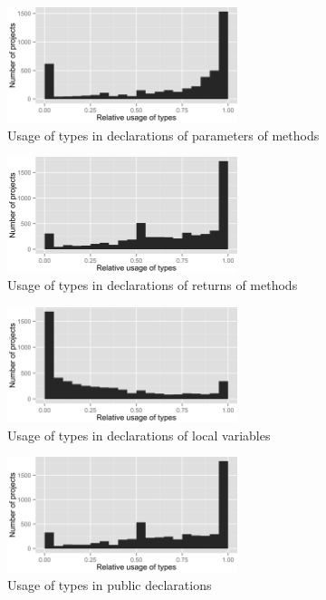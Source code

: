 \begin{figure}[h]
\centering 
\includegraphics[width=0.6\textwidth]{../aosd_2014/analysis/result/script/class/histograms/8_Method_Parameter.png} 
\caption{Usage of types in declarations of parameters of methods}
\end{figure}

\begin{figure}[h]
\centering 
\includegraphics[width=0.6\textwidth]{../aosd_2014/analysis/result/script/class/histograms/7_Method_Return.png} 
\caption{Usage of types in declarations of returns of methods}
\end{figure}

\begin{figure}[h]
\centering 
\includegraphics[width=0.6\textwidth]{../aosd_2014/analysis/result/script/class/histograms/6_Local_Variable.png} 
\caption{Usage of types in declarations of local variables}
\end{figure}

\begin{figure}[h]
\centering 
\includegraphics[width=0.6\textwidth]{../aosd_2014/analysis/result/script/class/histograms/13_Public.png} 
\caption{Usage of types in public declarations}
\end{figure}

